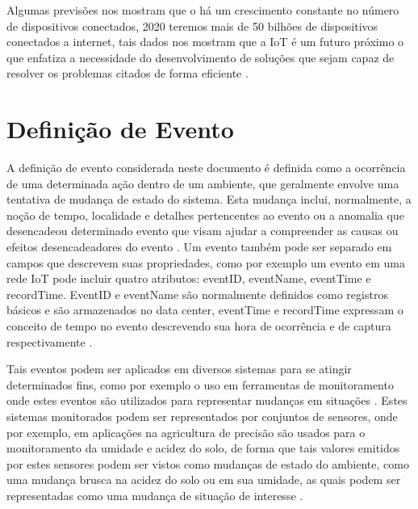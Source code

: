 \documentclass[tid,table]{texufpel} %
\begin{document}
Algumas previsões nos mostram que o há um crescimento constante no número de dispositivos conectados, 2020 teremos mais de 50 bilhões de dispositivos conectados a internet, tais dados nos mostram que a IoT é um futuro próximo o que enfatiza a necessidade do desenvolvimento de soluções que sejam capaz de resolver os problemas citados de forma eficiente \cite{xavier2016smart}.

\section{Definição de Evento}
A definição de evento considerada neste documento é definida como a ocorrência de uma determinada ação dentro de um ambiente, que geralmente envolve uma tentativa de mudança de estado do sistema. Esta mudança inclui, normalmente, a noção de tempo, localidade e detalhes pertencentes ao evento ou a anomalia que desencadeou determinado evento que visam ajudar a compreender as causas ou efeitos desencadeadores do evento \cite{fitzgerald2010common}.
Um evento também pode ser separado em campos que descrevem suas propriedades, como por exemplo um evento em uma rede IoT pode incluir quatro atributos: eventID, eventName, eventTime e recordTime. EventID e eventName são normalmente definidos como registros básicos e são armazenados no data center, eventTime e recordTime expressam o conceito de tempo no evento descrevendo sua hora de ocorrência e de captura respectivamente \cite{minbo2013information}. 

Tais eventos podem ser aplicados em diversos sistemas para se atingir determinados fins, como por exemplo o uso em ferramentas de monitoramento onde estes eventos são utilizados para representar mudanças em situações \cite{etzion2011event}. Estes sistemas monitorados podem ser representados por conjuntos de sensores, onde por exemplo, em aplicações na agricultura de precisão são usados para o monitoramento da umidade e acidez do solo, de forma que tais valores emitidos por estes sensores podem ser vistos como mudanças de estado do ambiente, como uma mudança brusca na acidez do solo ou em sua umidade, as quais podem ser representadas como uma mudança de situação de interesse \cite{garcia2011wireless}.
\end{document}
